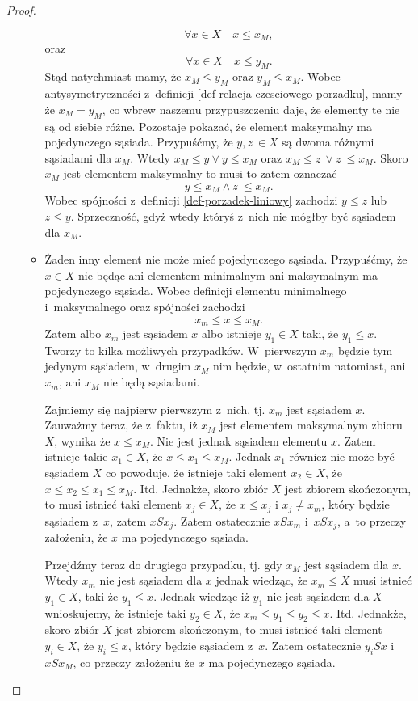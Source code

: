 \documentclass[12pt,a4paper]{report}
\begin{document}
\begin{proof}
\begin{enumerate}
\begin{itemize}
$$
\forall x \in X \quad x \leq x_M,
$$
oraz 
$$
\forall x \in X \quad x \leq y_M.
$$
Stąd natychmiast mamy, że $x_M \leq y_M$ oraz $y_M \leq  x_M$. Wobec antysymetryczności z~definicji \ref{def-relacja-czesciowego-porzadku}, mamy że $x_M = y_M$, co wbrew naszemu przypuszczeniu daje, że elementy te nie są od siebie różne.
Pozostaje pokazać, że element maksymalny ma pojedynczego sąsiada. Przypuśćmy, że $y, z~\in X$ są dwoma różnymi sąsiadami dla $x_M$. Wtedy $ x_M \leq y \lor y \leq x_M$ oraz $ x_M \leq z~\lor z~\leq x_M$. Skoro $x_M$ jest elementem maksymalny to musi to zatem oznaczać
$$
y \leq x_M \land z~\leq x_M.
$$ 
Wobec spójności z~definicji \ref{def-porzadek-liniowy} zachodzi $y \leq z$ lub $z \leq y$. Sprzeczność, gdyż wtedy któryś z~nich nie mógłby być sąsiadem dla $x_M$.

\item Żaden inny element nie może mieć pojedynczego sąsiada. Przypuśćmy, że $x \in X$ nie będąc ani elementem minimalnym ani maksymalnym ma pojedynczego sąsiada. Wobec definicji elementu minimalnego i~maksymalnego oraz spójności zachodzi
$$
x_m \leq x \leq x_M.
$$
Zatem albo $x_m$ jest sąsiadem $x$ albo istnieje $y_1 \in X$ taki, że $y_1 \leq x$.
Tworzy to kilka możliwych przypadków. W~pierwszym $x_m$ będzie tym jedynym sąsiadem, w~drugim $x_M$ nim będzie, w~ostatnim natomiast, ani $x_m$, ani $x_M$ nie będą sąsiadami.

Zajmiemy się najpierw pierwszym z~nich, tj. $x_m$ jest sąsiadem $x$. Zauważmy teraz, że z~faktu, iż $x_M$ jest elementem maksymalnym zbioru $X$, wynika że $ x \leq x_M$. Nie jest jednak sąsiadem elementu $x$. Zatem istnieje takie $x_1 \in X$, że $x\leq x_1 \leq x_M$. Jednak $x_1$ również nie może być sąsiadem $X$ co powoduje, że istnieje taki element $x_2 \in X$, że $x \leq x_2 \leq x_1 \leq x_M$. Itd. Jednakże, skoro zbiór $X$ jest zbiorem skończonym, to musi istnieć taki element $x_j \in X$, że $x \leq x_j \textrm{ i~} x_j \neq x_m$, który będzie sąsiadem z~$x$, zatem $xSx_j$. Zatem ostatecznie $xSx_m$ i~$xSx_j$, a~to przeczy założeniu, że $x$ ma pojedynczego sąsiada. 

Przejdźmy teraz do drugiego przypadku, tj. gdy $x_M$ jest sąsiadem dla $x$. Wtedy $x_m$ nie jest sąsiadem dla $x$ jednak wiedząc, że $x_m \leq X$ musi istnieć $y_1\in X$, taki że $y_1 \leq x$. Jednak wiedząc iż $y_1$ nie jest sąsiadem dla $X$ wnioskujemy, że istnieje taki $y_2 \in X$, że $x_m \leq y_1 \leq y_2 \leq x$. Itd.  Jednakże, skoro zbiór $X$ jest zbiorem skończonym, to musi istnieć taki element $y_i \in X$, że $y_i \leq x$, który będzie sąsiadem z~$x$. Zatem ostatecznie $y_iSx$ i~$xSx_M$, co przeczy założeniu że $x$ ma pojedynczego sąsiada.


\end{itemize}
\end{enumerate}
\end{proof}
\end{document}
